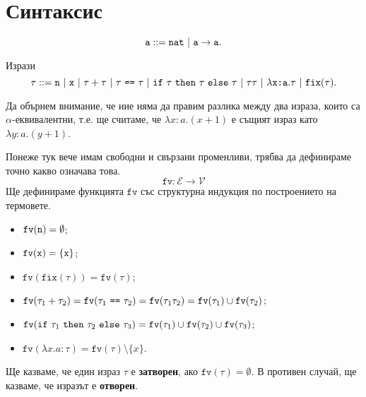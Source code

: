 \section{Синтаксис}

\newcommand{\fix}{\texttt{fix}}
\newcommand{\fv}{\texttt{fv}}

\[\texttt{a} ::= \texttt{nat}\ |\ \texttt{a} \to \texttt{a}.\]


Изрази
\[\tau ::= \vv{n}\ |\ \vv{x}\ |\ \tau + \tau\ |\ \tau\ \vv{==}\ \tau\ |\ \ifelse{\tau}{\tau}{\tau}\ |\ \tau\tau\ |\ \lambda \vv{x:a}.\tau\ |\ \fix(\tau).\]


Да обърнем внимание, че ние няма да правим разлика между два израза, които са $\alpha$-еквивалентни, т.е.
ще считаме, че $\lambda x:a. (x+1)$ е същият израз като $\lambda y:a. (y+1)$.

Понеже тук вече имам свободни и свързани променливи, трябва да дефинираме точно какво означава това.
\[\fv:\mathcal{E} \to \mathcal{V}\]
Ще дефинираме функцията $\texttt{fv}$ със структурна индукция по построението на термовете.

\begin{itemize}
\item
  $\fv(\vv{n}) = \emptyset$;
\item
  $\fv(\vv{x}) = \{\vv{x}\}$;
\item
  $\fv(\fix(\tau)) = \fv(\tau)$;
\item
  $\fv(\tau_1 + \tau_2) = \fv(\tau_1\ \vv{==}\ \tau_2) = \fv(\tau_1\tau_2) = \fv(\tau_1) \cup \fv(\tau_2)$;
\item
  $\fv(\ifelse{\tau_1}{\tau_2}{\tau_3}) = \fv(\tau_1) \cup \fv(\tau_2) \cup \fv(\tau_3)$;
\item
  $\fv(\lambda x.a:\tau) = \fv(\tau) \setminus \{x\}$.
\end{itemize}

Ще казваме, че един израз $\tau$ е {\bf затворен}, ако $\fv(\tau) = \emptyset$.
В противен случай, ще казваме, че изразът е {\bf отворен}.

